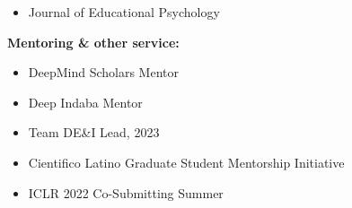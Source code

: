 \documentclass[margin]{res}
\begin{document}
\begin{resume}
{\begin{itemize}
 \item Journal of Educational Psychology
 \end{itemize}
{\bf Mentoring \& other service:} 
\begin{itemize} \itemsep -2pt
 \item DeepMind Scholars Mentor
 \item Deep Indaba Mentor
 \item Team DE\&I Lead, 2023 
 \item Cientifico Latino Graduate Student Mentorship Initiative
 \item ICLR 2022 Co-Submitting Summer
\end{itemize}
}
\end{resume}
\end{document}
